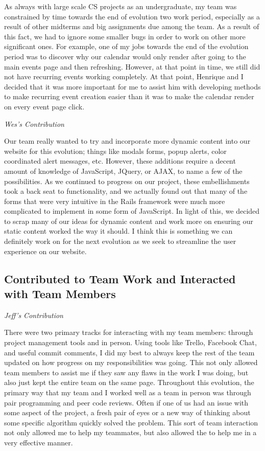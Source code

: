\documentclass[11pt]{article}
\begin{document}
As always with large scale CS projects as an undergraduate, my team was constrained by time towards the end of evolution two work period, especially as a result of other midterms and big assignments due among the team.  As a result of this fact, we had to ignore some smaller bugs in order to work on other more significant ones.  For example, one of my jobs towards the end of the evolution period was to discover why our calendar would only render after going to the main events page and then refreshing.  However, at that point in time, we still did not have recurring events working completely.  At that point, Henrique and I decided that it was more important for me to assist him with developing methods to make recurring event creation easier than it was to make the calendar render on every event page click.

\textit{Wes's Contribution}

Our team really wanted to try and incorporate more dynamic content into our website for this evolution; things like modals forms, popup alerts, color coordinated alert messages, etc.  However, these additions require a decent amount of knowledge of JavaScript, JQuery, or AJAX, to name a few of the possibilities.  As we continued to progress on our project, these embellishments took a back seat to functionality, and we actually found out that many of the forms that were very intuitive in the Rails framework were much more complicated to implement in some form of JavaScript.  In light of this, we decided to scrap many of our ideas for dynamic content and work more on ensuring our static content worked the way it should.  I think this is something we can definitely work on for the next evolution as we seek to streamline the user experience on our website. 

\subsection{Contributed to Team Work and Interacted with Team Members}

\textit{Jeff's Contribution}

There were two primary tracks for interacting with my team members: through project management tools and in person.  Using tools like Trello, Facebook Chat, and useful commit comments, I did my best to always keep the rest of the team updated on how progress on my responsibilities was going.  This not only allowed team members to assist me if they saw any flaws in the work I was doing, but also just kept the entire team on the same page.  Throughout this evolution, the primary way that my team and I worked well as a team in person was through pair programming and peer code reviews.  Often if one of us had an issue with some aspect of the project, a fresh pair of eyes or a new way of thinking about some specific algorithm quickly solved the problem.  This sort of team interaction not only allowed me to help my teammates, but also allowed the to help me in a very effective manner.
\end{document}

